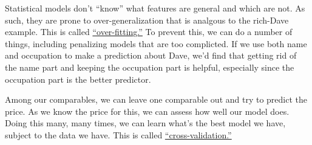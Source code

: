 \documentclass[
12pt, %
letterpaper, %
oneside, %
headinclude,footinclude, %
BCOR5mm, %
]{scrartcl}
\begin{document}
Statistical models don't ``know'' what features are general and which are not.
As such, they are prone to over-generalization that is analgous to the rich-Dave example. 
This is called \href{https://en.wikipedia.org/wiki/Overfitting}{``over-fitting.''}
To prevent this, we can do a number of things, including penalizing models that are too complicted.
If we use both name and occupation to make a prediction about Dave, we'd find that getting rid of the name part and keeping the occupation part is helpful, especially since the occupation part is the better predictor. 

Among our comparables, we can leave one comparable out and try to predict the price.
As we know the price for this, we can assess how well our model does.
Doing this many, many times, we can learn what's the best model we have, subject to the data we have.
This is called \href{https://en.wikipedia.org/wiki/Cross-validation_(statistics)}{``cross-validation.''}

\end{document}
